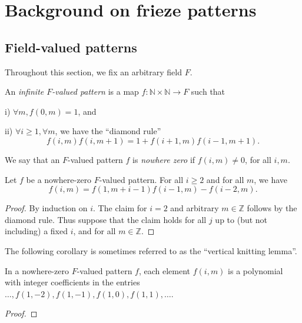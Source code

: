\chapter{Background on frieze patterns}\label{s:fp}
\section{Field-valued patterns}
Throughout this section, we fix an arbitrary field $F$. 
\begin{definition}\label{def:pattern}
    \leanok
    An {\it infinite $F$-valued pattern} is a map $f : \mathbb{N}\times\mathbb{N} \to F$ such that 
    
    i) $\forall m, f(0,m) = 1$, and 

    ii) $\forall i \geq 1, \forall m$, we have the ``diamond rule'' 
    \[
        f (i,m) f(i,m+1) = 1 + f(i+1,m) f(i-1,m+1).
    \]
\end{definition}
We say that an $F$-valued pattern $f$ is {\it nowhere zero} if $f(i,m) \neq 0$, for all $i,m$.  
\begin{lemma}
    \label{l:inftyContinuant}
    \leanok
    Let $f$ be a nowhere-zero $F$-valued pattern. For all $i \geq 2$ and for all $m$, we have 
    \[
        f(i,m) = f(1,m+i-1) f(i-1,m) - f(i-2,m).
    \]
\end{lemma}
\begin{proof}
    By induction on $i$. The claim for $i =2$ and arbitrary $m \in \mathbb{Z}$ follows by the diamond rule. Thus suppose that the 
    claim holds for all $j$ up
    to (but not including) a fixed $i$, and for all $m \in \mathbb{Z}$.   
\end{proof}

The following corollary is sometimes referred to as the ``vertical knitting lemma''.  
\begin{corollary}
    \label{l:horiztonal-knit}
    In a nowhere-zero $F$-valued pattern $f$, each element $f(i,m)$ is a polynomial with integer coefficients in the 
    entries $\ldots, f(1,-2), f(1,-1), f(1,0), f(1,1), \ldots$. 
\end{corollary}
\begin{proof}

\end{proof}

